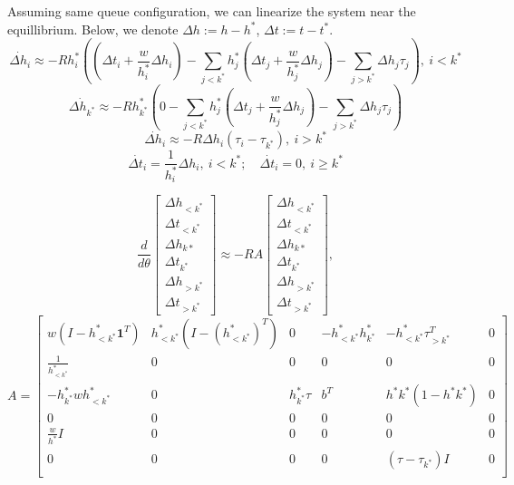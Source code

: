 \documentclass[12pt]{article}
\begin{document}

Assuming same queue configuration, we can linearize the system near the equillibrium. Below, we denote $\Delta h := h - h^*$, $\Delta t := t - t^*$.
$$ \dot{ \Delta h_i} \approx -Rh^*_i \left( \left( \Delta t_i + \frac{w }{h^*_i} \Delta h_i \right) - \sum_{j < k^*} h^*_j \left( \Delta t_j + \frac{w }{h^*_j} \Delta h_j \right)  - \sum_{j > k^*} \Delta h_j \tau_j \right), ~i < k^*$$
$$ \dot{ \Delta h_{k^*}} \approx -R h^*_{k^*} \left( 0 - \sum_{j < k^*} h^*_j \left( \Delta t_j + \frac{w }{h^*_j} \Delta h_j \right) - \sum_{j > k^*} \Delta h_j \tau_j \right) $$
$$ \dot{\Delta h_i} \approx -R \Delta h_i( \tau_i - \tau_{k^*}), ~i > k^* $$
$$ \dot{\Delta t_i} = \frac{1}{h^*_i} \Delta h_i, ~ i < k^*; \quad \dot{\Delta t_i} = 0, ~ i \geq k^*$$

$$ \frac{d}{d \theta} \begin{bmatrix} \Delta h_{< k^*} \\ \Delta t_{< k^*} \\ \Delta h_{k*} \\ \Delta t_{k^*} \\ \Delta h_{> k^*} \\ \Delta t_{> k^*} \end{bmatrix} \approx 
-R A
 \begin{bmatrix} \Delta h_{< k^*} \\ \Delta t_{< k^*} \\ \Delta h_{k*} \\ \Delta t_{k^*} \\ \Delta h_{> k^*} \\ \Delta t_{> k^*} \end{bmatrix} ,$$
 $$ A  = \begin{bmatrix} 
 w(I - h^*_{< k^*} \textbf{1}^T) &  h^*_{< k^*} (I - (h^*_{< k^*})^T)  & 0 & - h^*_{< k^*} h^*_{k^*}  & - h^*_{< k^*} \tau_{> k^*}^T & 0 \\
 \frac{1}{h^*_{<k^*}} & 0 & 0  & 0 & 0 & 0 \\
  - h^*_{k^*} w h^*_{< k^*}   & 0 & h^*_{k^*} \tau & b^T & h^*{k^*}(1-h^*{k^*}) & 0 \\ 
 0 & 0 & 0 & 0 & 0 & 0 \\ 
\frac{w}{h^*} I & 0 & 0 & 0 & 0 & 0 \\
0 & 0 & 0 & 0 &  (\tau - \tau_{k^*} ) I & 0 \\  \end{bmatrix} $$
\end{document}
